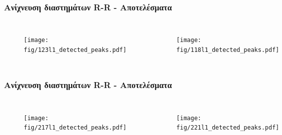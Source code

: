 \documentclass{beamer}
\begin{document}
\begin{frame}
\frametitle{Ανίχνευση διαστημάτων R-R - Αποτελέσματα}

\begin{columns}
\centering
{}
\begin{figure}
\texttt{[image: fig/123l1\_detected\_peaks.pdf]}
\end{figure}

\begin{figure}
\texttt{[image: fig/118l1\_detected\_peaks.pdf]}
\end{figure}
\end{columns}
\end{frame}

\begin{frame}
\frametitle{Ανίχνευση διαστημάτων R-R - Αποτελέσματα}

\begin{columns}
\centering
{}
\begin{figure}
\texttt{[image: fig/217l1\_detected\_peaks.pdf]}
\end{figure}

\begin{figure}
\texttt{[image: fig/221l1\_detected\_peaks.pdf]}
\end{figure}
\end{columns}
\end{frame}
\end{document}

